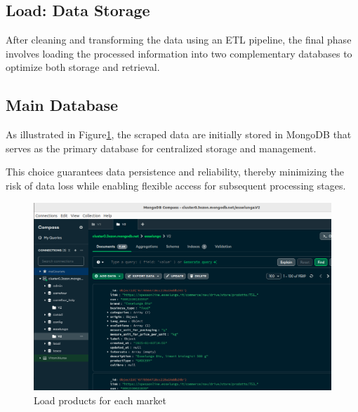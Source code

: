 
\subsection{Load: Data Storage}
After cleaning and transforming the data using an ETL pipeline, the final phase involves loading the processed information into two complementary databases to optimize both storage and retrieval.


\subsection{Main Database}
As illustrated in Figure\ref{fig:load_data_mongo}, the scraped data are initially stored in MongoDB that serves as the primary database for centralized storage and management.

This choice guarantees data persistence and reliability, thereby minimizing the risk of data loss while enabling flexible access for subsequent processing stages.


\begin{center}
\begin{figure}[H]
    \includegraphics[scale=0.35]{images/load_data.png}
    \caption{Load products for each market} 
    \label{fig:load_data_mongo}
\end{figure}
\end{center}

